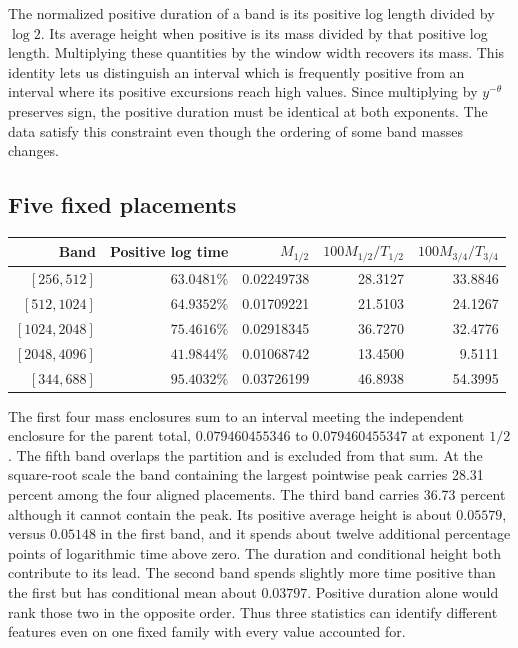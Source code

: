 \documentclass[12pt,letterpaper]{article}
\begin{document}
The normalized positive duration of a band is its positive log length divided by $\log2$. Its average height when positive is its mass divided by that positive log length. Multiplying these quantities by the window width recovers its mass. This identity lets us distinguish an interval which is frequently positive from an interval where its positive excursions reach high values. Since multiplying by $y^{-\theta}$ preserves sign, the positive duration must be identical at both exponents. The data satisfy this constraint even though the ordering of some band masses changes.

\subsection{Five fixed placements}

\begin{center}\small
\begin{tabular}{@{}rrrrr@{}}
\toprule
Band & Positive log time & $M_{1/2}$ & $100M_{1/2}/T_{1/2}$ & $100M_{3/4}/T_{3/4}$\\
\midrule
$[256,512]$   & $63.0481\%$ & 0.02249738 & 28.3127 & 33.8846\\
$[512,1024]$  & $64.9352\%$ & 0.01709221 & 21.5103 & 24.1267\\
$[1024,2048]$ & $75.4616\%$ & 0.02918345 & 36.7270 & 32.4776\\
$[2048,4096]$ & $41.9844\%$ & 0.01068742 & 13.4500 & 9.5111\\
\midrule
$[344,688]$   & $95.4032\%$ & 0.03726199 & 46.8938 & 54.3995\\
\bottomrule
\end{tabular}
\end{center}

The first four mass enclosures sum to an interval meeting the independent enclosure for the parent total, $0.079460455346$ to $0.079460455347$ at exponent $1/2$. The fifth band overlaps the partition and is excluded from that sum. At the square-root scale the band containing the largest pointwise peak carries 28.31 percent among the four aligned placements. The third band carries 36.73 percent although it cannot contain the peak. Its positive average height is about $0.05579$, versus $0.05148$ in the first band, and it spends about twelve additional percentage points of logarithmic time above zero. The duration and conditional height both contribute to its lead. The second band spends slightly more time positive than the first but has conditional mean about $0.03797$. Positive duration alone would rank those two in the opposite order. Thus three statistics can identify different features even on one fixed family with every value accounted for.
\end{document}

